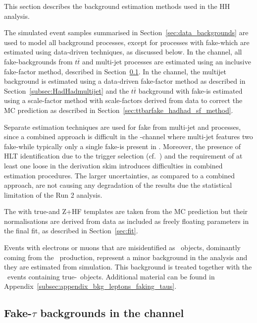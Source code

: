 This section describes the background estimation methods used in the HH analysis. 

The simulated event samples summarised in Section~\ref{sec:data_backgrounds} are used to model all background processes, except for processes with fake-\tauhad which are estimated using data-driven techniques, as discussed below. In the \lephad channel, all fake-\tauhad backgrounds from $t\bar{t}$ and multi-jet processes are estimated using an inclusive fake-factor method, described in Section~\ref{subsec:LepHadfake}. In the \hadhad channel, the multijet background is estimated using a data-driven fake-factor method as described in Section~\ref{subsec:HadHadmultijet} and the $t\bar{t}$ background with fake-\tauhad is estimated using a scale-factor method with scale-factors derived from data to correct the MC prediction as described in Section~\ref{sec:ttbarfake_hadhad_sf_method}.

Separate estimation techniques are used for fake \tauhad from
multi-jet and \ttbar processes, since a combined approach is difficult
in the \hadhad-channel where multi-jet features two fake-\tauhad while
typically only a single fake-\tauhad is present in \ttbar. Moreover,
the presence of HLT \tauhad identification due to the \hadhad trigger
selection (cf.~) and the
requirement of at least one loose \tauhad in the derivation skim
introduces difficulties in combined estimation procedures. The larger
uncertainties, as compared to a combined approach, are not causing any
degradation of the results due the statistical limitation of the Run 2
analysis.

The \ttbar with true-\tauhad and Z+HF templates are taken from the MC prediction but their normalisations are derived from data as included as freely floating parameters in the final fit, as described in Section~\ref{sec:fit}. 

Events with electrons or muons that are misidentified as \tauhad\ objects, dominantly coming from the \ttbar\ production, represent a minor background in the analysis and they are estimated from simulation. This background is treated together with the \ttbar\ events containing true-\tauhad\ objects. Additional material can be found in Appendix~\ref{subsec:appendix_bkg_leptons_faking_taus}.


\subsection{Fake-$\tau$ backgrounds in the \lephad channel}
\label{subsec:LepHadfake}

